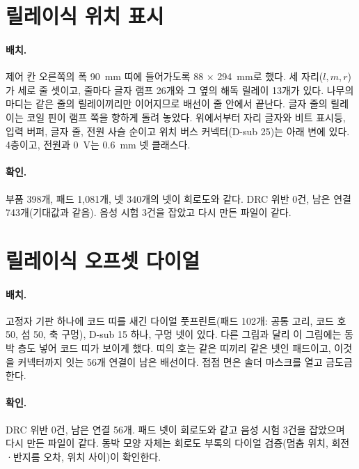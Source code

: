 
\section{릴레이식 위치 표시}\label{pcb:position-display}

\paragraph{배치.} 제어 칸 오른쪽의 폭 90~mm 띠에 들어가도록 88 × 294~mm로 했다. 세 자리($l, m, r$)가 세로 줄 셋이고, 줄마다
글자 램프 26개와 그 옆의 해독 릴레이 13개가 있다. 나무의 마디는 같은 줄의 릴레이끼리만 이어지므로 배선이 줄 안에서
끝난다. 글자 줄의 릴레이는 코일 핀이 램프 쪽을 향하게 돌려 놓았다. 위에서부터 자리 글자와 비트 표시등, 입력 버퍼, 글자 줄, 전원 사슬 순이고 위치 버스 커넥터(D-sub 25)는 아래 변에 있다.
4층이고, 전원과 0~V는 0.6~mm 넷 클래스다.

\paragraph{확인.} 부품 398개, 패드 1,081개, 넷 340개의 넷이 회로도와 같다. DRC 위반 0건, 남은 연결 743개(기대값과 같음).
음성 시험 3건을 잡았고 다시 만든 파일이 같다.


\section{릴레이식 오프셋 다이얼}\label{pcb:offset-dial}

\paragraph{배치.} 고정자 기판 하나에 코드 띠를 새긴 다이얼 풋프린트(패드 102개: 공통 고리, 코드 호 50, 섬 50, 축 구멍),
D-sub 15 하나, 구멍 넷이 있다. 다른 그림과 달리 이 그림에는 동박 층도 넣어 코드 띠가 보이게 했다. 띠의 호는 같은 띠끼리
같은 넷인 패드이고, 이것을 커넥터까지 잇는 56개 연결이 남은 배선이다. 접점 면은 솔더 마스크를 열고 금도금한다.

\paragraph{확인.} DRC 위반 0건, 남은 연결 56개. 패드 넷이 회로도와 같고 음성 시험 3건을 잡았으며 다시 만든 파일이 같다.
동박 모양 자체는 회로도 부록의 다이얼 검증(멈춤 위치, 회전·반지름 오차, 위치 사이)이 확인한다.


